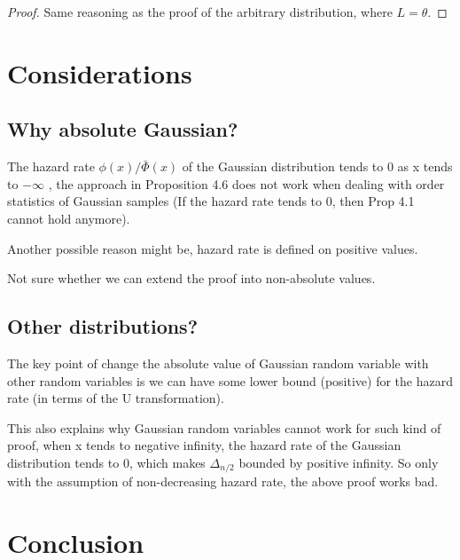 \documentclass{article}
\theoremstyle{plain}
\begin{document}
\begin{proof}
Same reasoning as the proof of the arbitrary distribution, where $L =\theta$.
\end{proof}


\section{Considerations}

\subsection{Why absolute Gaussian?}

The hazard rate $\phi(x) / \bar{\Phi}(x)$ of the Gaussian distribution tends to 0 as x tends to $- \infty$ , the approach in  \cite{boucheron2012} Proposition 4.6 does not work when dealing with order statistics of Gaussian samples (If the hazard rate tends to 0, then Prop 4.1 cannot hold anymore).

Another possible reason might be, hazard rate is defined on positive values.

Not sure whether we can extend the proof into non-absolute values.


\subsection{Other distributions?}
The key point of change the absolute value of Gaussian random variable with other random variables is we can have some lower bound (positive) for the hazard rate (in terms of the U transformation). 

This also explains why Gaussian random variables cannot work for such kind of proof, when x tends to negative infinity, the hazard rate of the Gaussian distribution tends to 0, which makes $\Delta_{n/2}$ bounded by positive infinity. So only with the assumption of non-decreasing hazard rate, the above proof works bad. 


\section{Conclusion}
\end{document}
